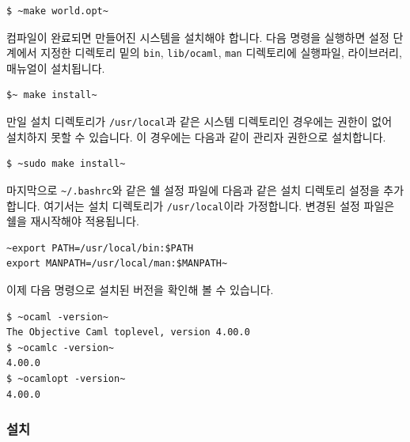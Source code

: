 \begin{lstlisting}
$ ~make world.opt~
\end{lstlisting}

컴파일이 완료되면 만들어진 \OCAML{} 시스템을 설치해야 합니다. 다음 명령을
실행하면 설정 단계에서 지정한 디렉토리 밑의 \texttt{bin}, \texttt{lib/ocaml},
\texttt{man} 디렉토리에 실행파일, 라이브러리, 매뉴얼이 설치됩니다.

\begin{lstlisting}
$~ make install~
\end{lstlisting}

만일 설치 디렉토리가 \texttt{/usr/local}과 같은 시스템 디렉토리인
경우에는 권한이 없어 설치하지 못할 수 있습니다. 이 경우에는 다음과 같이 관리자
권한으로 설치합니다.

\begin{lstlisting}
$ ~sudo make install~
\end{lstlisting}

마지막으로 \texttt{\~{}/.bashrc}와 같은 쉘 설정 파일에 다음과 같은 설치 디렉토리
설정을 추가합니다. 여기서는 설치 디렉토리가 \texttt{/usr/local}이라
가정합니다. 변경된 설정 파일은 쉘을 재시작해야 적용됩니다.

\begin{lstlisting}
~export PATH=/usr/local/bin:$PATH
export MANPATH=/usr/local/man:$MANPATH~
\end{lstlisting}

이제 다음 명령으로 설치된 \OCAML{} 버전을 확인해 볼 수 있습니다.

\begin{lstlisting}
$ ~ocaml -version~
The Objective Caml toplevel, version 4.00.0
$ ~ocamlc -version~
4.00.0
$ ~ocamlopt -version~
4.00.0
\end{lstlisting}


\subsubsection{\GODI{} 설치}


\subsection{\MAC{}}



\subsection{\WINDOWS{}}

